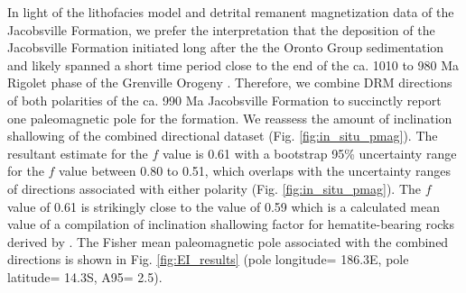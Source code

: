 \documentclass[draft]{agujournal2019}
\begin{document}
In light of the lithofacies model and detrital remanent magnetization data of the Jacobsville Formation, we prefer the interpretation that the deposition of the Jacobsville Formation initiated long after the the Oronto Group sedimentation and likely spanned a short time period close to the end of the ca. 1010 to 980 Ma Rigolet phase of the Grenville Orogeny \cite{Rivers2012a, Hodgin2022a}. Therefore, we combine DRM directions of both polarities of the ca. 990 Ma Jacobsville Formation to succinctly report one paleomagnetic pole for the formation. We reassess the amount of inclination shallowing of the combined directional dataset (Fig. \ref{fig:in_situ_pmag}). The resultant estimate for the $f$ value is 0.61 with a bootstrap 95\% uncertainty range for the $f$ value between 0.80 to 0.51, which overlaps with the uncertainty ranges of directions associated with either polarity (Fig. \ref{fig:in_situ_pmag}). The $f$ value of 0.61 is strikingly close to the value of 0.59 which is a calculated mean value of a compilation of inclination shallowing factor for hematite-bearing rocks derived by \cite{Bilardello2010b}. The Fisher mean paleomagnetic pole associated with the combined directions is shown in Fig. \ref{fig:EI_results} (pole longitude= 186.3\textdegree E, pole latitude= 14.3\textdegree S, A95= 2.5\textdegree). 
\end{document}
